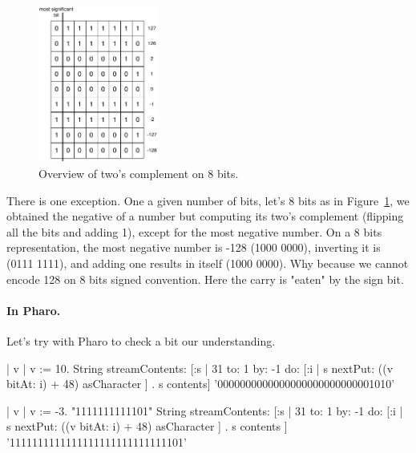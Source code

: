 \documentclass[a4paper,10pt,twoside]{book}
\begin{document}
\begin{figure}[h]
\begin{center}
\includegraphics[width=0.35\textwidth]{8bits-Table}
\caption{Overview of two's complement on 8 bits.\label{negativePositive}}
\end{center}
\end{figure}

There is one exception. One a given number of bits, let's 8 bits as in Figure~\ref{negativePositive},
we obtained the negative of a number but computing its two's complement (flipping all the bits and adding 1), except for the most negative number. On a 8 bits representation, the most negative number is -128 (1000 0000), inverting it is (0111 1111), and adding one results in itself (1000 0000). Why because we cannot encode 128 on 8 bits signed convention. Here the carry is "eaten" by the sign bit. 


\paragraph{In Pharo.}
Let's try with Pharo to check a bit our understanding. 

%
\begin{code}{}
| v |
v := 10. 
String streamContents: [:s | 
	31 to: 1 by: -1 do: [:i | s nextPut: ((v bitAt: i) + 48) asCharacter   ] .
	s contents] 
	 '0000000000000000000000000001010'

| v |
v := -3.  "1111111111101"
String streamContents: [:s | 
	31 to: 1 by: -1 do: [:i | s nextPut: ((v bitAt: i) + 48) asCharacter   ] .
	s contents ]
	 '1111111111111111111111111111101' 
\end{code}
	
\end{document}
